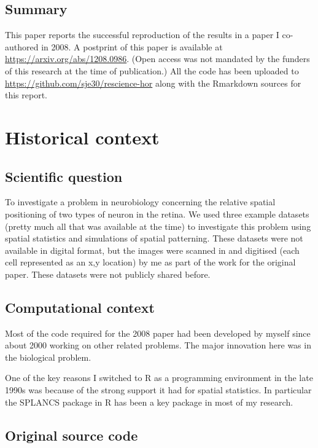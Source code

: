 
\subsection{Summary}

This paper reports the successful reproduction of the results in a
paper I co-authored in 2008\supercite{Eglen2008-ca}. A postprint of
this paper is available at
\url{https://arxiv.org/abs/1208.0986}. (Open access was not mandated
by the funders of this research at the time of publication.) All the
code has been uploaded to \url{https://github.com/sje30/rescience-hor}
along with the Rmarkdown sources for this report.

\section{Historical context}


\subsection{Scientific question}

To investigate a problem in neurobiology concerning the relative spatial
positioning of two types of neuron in the retina. We used three example
datasets (pretty much all that was available at the time) to investigate
this problem using spatial statistics and simulations of spatial
patterning. These datasets were not available in digital format, but the
images\supercite{Wassle1978-cd,Wassle2000-aa} were
scanned in and digitised (each cell represented as an x,y location) by
me as part of the work for the original paper. These datasets were not
publicly shared before.

\subsection{Computational context}

Most of the code required for the 2008 paper had been developed by
myself since about 2000 working on other related problems. The major
innovation here was in the biological problem.

One of the key reasons I switched to R as a programming environment in
the late 1990s was because of the strong support it had for spatial
statistics. In particular the SPLANCS package\supercite{splancs} in R
has been a key package in most of my research.

\subsection{Original source code}

